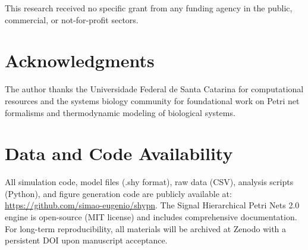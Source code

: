 \documentclass[twocolumn,11pt]{article}
\begin{document}
This research received no specific grant from any funding agency in the public, commercial, or not-for-profit sectors.

\section*{Acknowledgments}

The author thanks the Universidade Federal de Santa Catarina for computational resources and the systems biology community for foundational work on Petri net formalisms and thermodynamic modeling of biological systems.

\section*{Data and Code Availability}

All simulation code, model files (.shy format), raw data (CSV), analysis scripts (Python), and figure generation code are publicly available at: \url{https://github.com/simao-eugenio/shypn}. The Signal Hierarchical Petri Nets 2.0 engine is open-source (MIT license) and includes comprehensive documentation. For long-term reproducibility, all materials will be archived at Zenodo with a persistent DOI upon manuscript acceptance.
\end{document}
